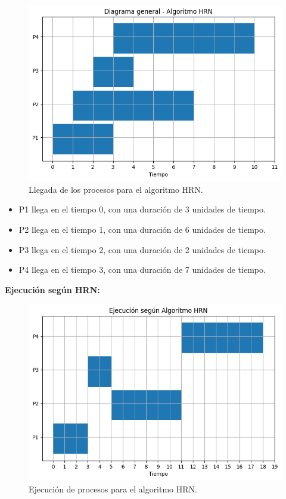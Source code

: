 \begin{figure}[H]
	\centering
	\includegraphics[width=0.8\linewidth]{Imagenes/diagrama_hrn.png}
	\caption{Llegada de los procesos para el algoritmo HRN.}
\end{figure}
\begin{itemize}
	\item P1 llega en el tiempo 0, con una duración de 3 unidades de tiempo.
	\item P2 llega en el tiempo 1, con una duración de 6 unidades de tiempo.
	\item P3 llega en el tiempo 2, con una duración de 2 unidades de tiempo.
	\item P4 llega en el tiempo 3, con una duración de 7 unidades de tiempo.
\end{itemize}



\textbf{Ejecución según HRN:}

\begin{figure}[H]
	\centering
	\includegraphics[width=0.8\linewidth]{Imagenes/ejecucion_hrn.png}
	\caption{Ejecución de procesos para el algoritmo HRN.}
\end{figure}


